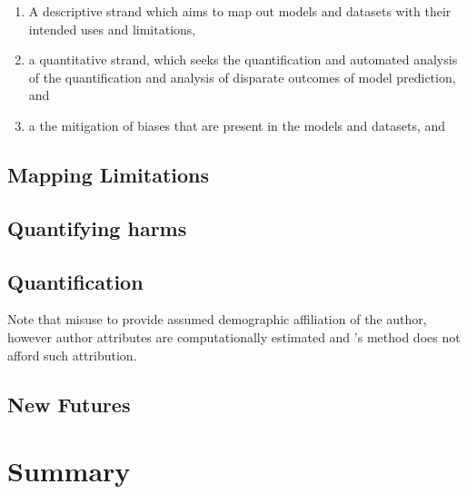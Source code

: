 \begin{enumerate}
  \item{A descriptive strand which aims to map out models and datasets with their intended uses and limitations,}
  \item{a quantitative strand, which seeks the quantification and automated analysis of the quantification and analysis of disparate outcomes of model prediction, and}
  \item{a the mitigation of biases that are present in the models and datasets, and}
\end{enumerate}

\subsection{Mapping Limitations}

\cite{Mitchell:2019}
\cite{Bender-Friedman:2018}
\cite{Hovy-Spruit:2016}
\cite{Blodget:2020}
\cite{Holstein:2019}

\subsection{Quantifying harms}
\cite{Buolamwini:2018}
\cite{Kulynych:2020}
\cite{Shah:2020}
\cite{Vanmassenhove:2018}
\cite{Waseem:2016}
\cite{Derzynski:2016}
\cite{Birhane:2020}

\subsection{Quantification}
\cite{Agarwal:2018}
\cite{Romanov:2019}
Note that \cite{Sap:2019} misuse \cite{Blodgett:2016} to provide assumed demographic affiliation of the author, however author attributes are computationally estimated and \cite{Blodgett:2016}'s method does not afford such attribution.
\cite{Davidson:2019}
\cite{Zhao:2017}

\subsection{New Futures}

\cite{Yimam-Biemann:2018}
\cite{Bingel:2018}
\cite{Kalluri:2019}

\section{Summary}
